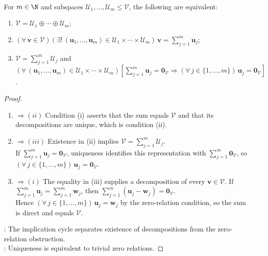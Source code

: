 \begin{proposition} \label{prop:direct-sum-equivalent-conditions} \\
For $m\in\N$ and subspaces $\mathcal{U}_1,\ldots,\mathcal{U}_m\leq\mathcal{V}$, the following are equivalent:
\begin{enumerate}[label=(\roman*)]
\setlength{\itemsep}{0pt}
\item $\mathcal{V}=\mathcal{U}_1\oplus\cdots\oplus\mathcal{U}_m$;
\item $(\forall\,\mathbf{v}\in\mathcal{V})(\exists!\,(\mathbf{u}_1,\ldots,\mathbf{u}_m)\in\mathcal{U}_1\times\cdots\times\mathcal{U}_m)\,\mathbf{v}=\sum\limits_{j=1}^{m}\mathbf{u}_j$;
\item $\mathcal{V}=\sum\limits_{j=1}^{m}\mathcal{U}_j$ and $(\forall\,(\mathbf{u}_1,\ldots,\mathbf{u}_m)\in\mathcal{U}_1\times\cdots\times\mathcal{U}_m)[\sum\limits_{j=1}^{m}\mathbf{u}_j=\mathbf{0}_{\mathcal{V}}\Rightarrow(\forall\,j\in\{1,\ldots,m\})\,\mathbf{u}_j=\mathbf{0}_{\mathcal{V}}]$.
\end{enumerate}
\begin{proof}
\begin{enumerate}[label=(\roman*)]
\setlength{\itemsep}{0pt}
\item[$(i)$] $\Rightarrow (ii)$ Condition (i) asserts that the sum equals $\mathcal{V}$ and that its decompositions are unique, which is condition (ii).
\item[$(ii)$] $\Rightarrow (iii)$ Existence in (ii) implies $\mathcal{V}=\sum\limits_{j=1}^{m}\mathcal{U}_j$.\\
If $\sum\limits_{j=1}^{m}\mathbf{u}_j=\mathbf{0}_{\mathcal{V}}$, uniqueness identifies this representation with $\sum\limits_{j=1}^{m}\mathbf{0}_{\mathcal{V}}$, so $(\forall\,j\in\{1,\ldots,m\})\,\mathbf{u}_j=\mathbf{0}_{\mathcal{V}}$.
\item[$(iii)$] $\Rightarrow (i)$ The equality in (iii) supplies a decomposition of every $\mathbf{v}\in\mathcal{V}$. If $\sum\limits_{j=1}^{m}\mathbf{u}_j=\sum\limits_{j=1}^{m}\mathbf{w}_j$, then $\sum\limits_{j=1}^{m}(\mathbf{u}_j-\mathbf{w}_j)=\mathbf{0}_{\mathcal{V}}$.\\
Hence $(\forall\,j\in\{1,\ldots,m\})\,\mathbf{u}_j=\mathbf{w}_j$ by the zero-relation condition, so the sum is direct and equals $\mathcal{V}$.
\end{enumerate}
: The implication cycle separates existence of decompositions from the zero-relation obstruction.\\
: Uniqueness is equivalent to trivial zero relations.
\end{proof}
\end{proposition}

